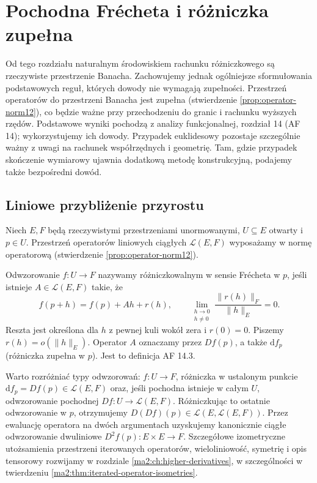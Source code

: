 \chapter{Pochodna Frécheta i różniczka zupełna}
\label{ma2:ch:frechet}

Od tego rozdziału naturalnym środowiskiem rachunku
różniczkowego są rzeczywiste przestrzenie Banacha.
Zachowujemy jednak ogólniejsze sformułowania podstawowych
reguł, których dowody nie wymagają zupełności.
Przestrzeń operatorów do przestrzeni Banacha jest zupełna
(stwierdzenie \ref{prop:operator-norm12}), co będzie ważne
przy przechodzeniu do granic i rachunku wyższych rzędów.
Podstawowe wyniki pochodzą z analizy funkcjonalnej,
rozdział 14 (AF 14); wykorzystujemy ich dowody.
Przypadek euklidesowy pozostaje szczególnie ważny z uwagi
na rachunek współrzędnych i geometrię. Tam, gdzie
przypadek skończenie wymiarowy ujawnia dodatkową metodę
konstrukcyjną, podajemy także bezpośredni dowód.

\section{Liniowe przybliżenie przyrostu}

Niech $E,F$ będą rzeczywistymi przestrzeniami unormowanymi,
$U\subseteq E$ otwarty i $p\in U$.
Przestrzeń operatorów liniowych ciągłych
$\mathcal L(E,F)$ wyposażamy w normę operatorową
(stwierdzenie \ref{prop:operator-norm12}).

\begin{definicja}
\label{ma2:def:frechet}
Odwzorowanie $f:U\to F$ nazywamy różniczkowalnym
w sensie Frécheta w $p$, jeśli istnieje
$A\in\mathcal L(E,F)$ takie, że
\[
 f(p+h)=f(p)+Ah+r(h),\qquad
 \lim_{\substack{h\to0\\h\ne0}}
 \frac{\|r(h)\|_F}{\|h\|_E}=0.
\]
Reszta jest określona dla $h$ z pewnej kuli wokół zera
i $r(0)=0$. Piszemy $r(h)=o(\|h\|_E)$.
Operator $A$ oznaczamy przez $Df(p)$, a także
$\mathrm df_p$ (różniczka zupełna w $p$).
Jest to definicja AF 14.3.
\end{definicja}

Warto rozróżniać typy odwzorowań: $f:U\to F$,
różniczka w ustalonym punkcie
$\mathrm df_p=Df(p)\in\mathcal L(E,F)$ oraz,
jeśli pochodna istnieje w całym $U$,
odwzorowanie pochodnej $Df:U\to\mathcal L(E,F)$.
Różniczkując to ostatnie odwzorowanie w $p$,
otrzymujemy $D(Df)(p)\in\mathcal L(E,\mathcal L(E,F))$.
Przez ewaluację operatora na dwóch argumentach
uzyskujemy kanonicznie ciągłe odwzorowanie
dwuliniowe $D^2f(p):E\times E\to F$.
Szczegółowe izometryczne utożsamienia przestrzeni
iterowanych operatorów, wieloliniowość, symetrię
i opis tensorowy rozwijamy w rozdziale
\ref{ma2:ch:higher-derivatives}, w szczególności
w twierdzeniu \ref{ma2:thm:iterated-operator-isometries}.


